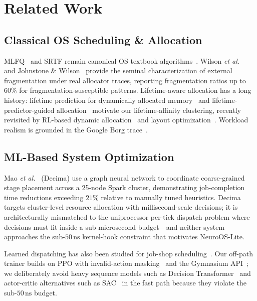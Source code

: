 \section{Related Work}
\label{sec:related}



\subsection{Classical OS Scheduling \& Allocation}

MLFQ~\cite{Corbato1962} and SRTF remain canonical OS textbook algorithms~\cite{Arpaci2018}.
Wilson \textit{et al.}~\cite{Wilson1995} and Johnstone \&
Wilson~\cite{Johnstone1998} provide the seminal characterization of external
fragmentation under real allocator traces, reporting fragmentation ratios up to
$60\%$ for fragmentation-susceptible patterns. Lifetime-aware allocation has
a long history: lifetime prediction for dynamically allocated
memory~\cite{CohnSingh1996} and lifetime-predictor-guided
allocation~\cite{BarrettZorn1993} motivate our lifetime-affinity
clustering, recently revisited by RL-based dynamic
allocation~\cite{LimMaddukuri2024} and layout optimization~\cite{Sha2026AIMO}.
Workload realism is grounded in the Google Borg
trace~\cite{Borg2020}.

\subsection{ML-Based System Optimization}

Mao \textit{et al.}~\cite{Mao2019} (Decima) use a graph neural network to
coordinate coarse-grained stage placement across a 25-node Spark cluster,
demonstrating job-completion time reductions exceeding $21\%$ relative to
manually tuned heuristics. Decima targets cluster-level resource allocation
with millisecond-scale decisions; it is architecturally mismatched to the
uniprocessor per-tick dispatch problem where decisions must fit inside a
sub-microsecond budget---and neither system approaches the sub-$50\,\text{ns}$
kernel-hook constraint that motivates NeuroOS-Lite.

Learned dispatching has also been studied for job-shop
scheduling~\cite{Zhang2020Dispatch}. Our off-path trainer builds on PPO with
invalid-action masking~\cite{Huang2022} and the Gymnasium
API~\cite{Gymnasium2023}; we deliberately avoid heavy sequence models such as
Decision Transformer~\cite{DecisionTransformer2021} and actor-critic
alternatives such as SAC~\cite{SAC2018} in the fast path because they violate
the sub-$50\,\text{ns}$ budget.

